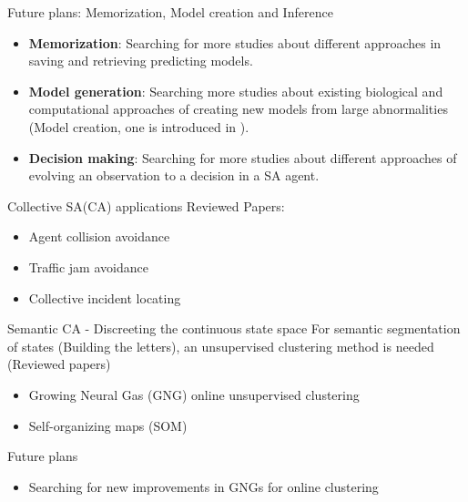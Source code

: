 \documentclass[unknownkeysallowed]{beamer}
\begin{document}
\begin{frame}{Future plans: Memorization, Model creation and Inference}
	\begin{itemize}
		\item \textbf{Memorization}: Searching for more studies about different approaches in saving and retrieving predicting models.
		\item \textbf{Model generation}: Searching more studies about existing biological and computational approaches of creating new models from large abnormalities (Model creation, one is introduced in \cite{regazzoni-2020-multi-sensorial-generative-and-descriptive-self-awareness-models-for-autonomous-systems}). 
		\item \textbf{Decision making}: Searching for more studies about different approaches of evolving an observation to a decision in a SA agent.
	\end{itemize}
\end{frame}

\begin{frame}{Collective SA(CA) applications}
	Reviewed Papers:
	\begin{itemize}
		\item Agent collision avoidance  
		\item Traffic jam avoidance 
		\item Collective incident locating 
	\end{itemize}
\end{frame}

\begin{frame}{Semantic CA - Discreeting the continuous state space}
	For semantic segmentation of states (Building the letters), an unsupervised clustering method is needed (Reviewed papers)
	\begin{itemize}
		\item Growing Neural Gas (GNG) online unsupervised clustering  
		\item Self-organizing maps (SOM) 
	\end{itemize}
	Future plans
	\begin{itemize}
		\item Searching for new improvements in GNGs for online clustering 
	\end{itemize}
\end{frame}
\end{document}

